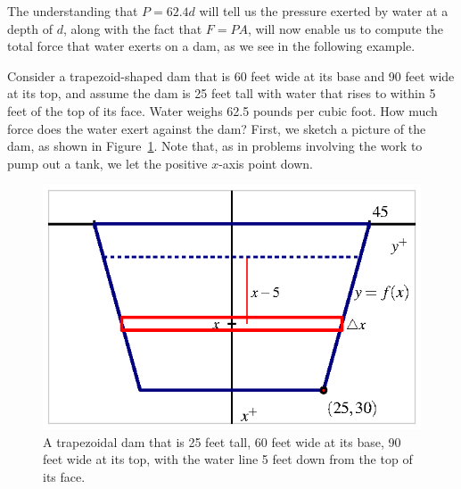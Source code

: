 The understanding that $P = 62.4d$ will tell us the pressure exerted by water at a depth of $d$, along with the fact that $F = PA$, will now enable us to compute the total force that water exerts on a dam, as we see in the following example.

\bex Consider a trapezoid-shaped dam that is 60 feet wide at its base and 90 feet wide at its top, and assume the dam is 25 feet tall with water that rises to within 5 feet of the top of its face.  Water weighs 62.5 pounds per cubic foot.  How much force does the water exert against the dam?
\eex
First, we sketch a picture of the dam, as shown in Figure~\ref{F:6.4.DamEx}.  Note that, as in problems involving the work to pump out a tank, we let the positive $x$-axis point down.
\begin{figure}[h]
\begin{center}
\includegraphics{figures/6_4_DamEx.eps}
\caption{A trapezoidal dam that is 25 feet tall, 60 feet wide at its base, 90 feet wide at its top, with the water line 5 feet down from the top of its face.} \label{F:6.4.DamEx}
\end{center}
\end{figure}

